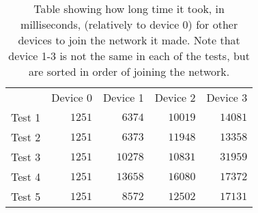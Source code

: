 \begin{table}[ht]
\centering
\begin{tabular}{lllll}
                            & Device 0                  & Device 1                   & Device 2                   & Device 3                   \\ \cline{2-5} 
\multicolumn{1}{r|}{Test 1} & \multicolumn{1}{r|}{$1251$} & \multicolumn{1}{r|}{$6374$}  & \multicolumn{1}{r|}{$10019$} & \multicolumn{1}{r|}{$14081$} \\ \cline{2-5} 
\multicolumn{1}{r|}{Test 2} & \multicolumn{1}{r|}{$1251$} & \multicolumn{1}{r|}{$6373$}  & \multicolumn{1}{r|}{$11948$} & \multicolumn{1}{r|}{$13358$} \\ \cline{2-5} 
\multicolumn{1}{r|}{Test 3} & \multicolumn{1}{r|}{$1251$} & \multicolumn{1}{r|}{$10278$} & \multicolumn{1}{r|}{$10831$} & \multicolumn{1}{r|}{$31959$} \\ \cline{2-5} 
\multicolumn{1}{r|}{Test 4} & \multicolumn{1}{r|}{$1251$} & \multicolumn{1}{r|}{$13658$} & \multicolumn{1}{r|}{$16080$} & \multicolumn{1}{r|}{$17372$} \\ \cline{2-5} 
\multicolumn{1}{r|}{Test 5} & \multicolumn{1}{r|}{$1251$} & \multicolumn{1}{r|}{$8572$}  & \multicolumn{1}{r|}{$12502$} & \multicolumn{1}{r|}{$17131$} \\ \cline{2-5} 
\end{tabular}
\caption{Table showing how long time it took, in milliseconds, (relatively to device 0) for other devices to join the network it made. Note that device 1-3 is not the same in each of the tests, but are sorted in order of joining the network.}
\label{tab:ccrc_test}
\end{table}